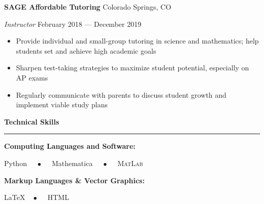 \documentclass{article}
\begin{document}
\hspace{1.5em} \textbf{SAGE Affordable Tutoring} \hfill Colorado Springs, CO

\hspace{1.5em} \textit{Instructor} \hfill February 2018 --- December 2019

\vspace{-0.5em}

\begin{itemize}[leftmargin=6.0em]
\setlength{\itemsep}{0em}
\item Provide individual and small-group tutoring in science and mathematics; help students set and achieve high academic goals
\item Sharpen test-taking strategies to maximize student potential, especially on AP exams
\item Regularly communicate with parents to discuss student growth and implement viable study plans
\end{itemize}

\vspace{1em}

\textbf{\Large{Technical Skills}} \\[-0.5em]
\rule{\textwidth}{1pt}

\hspace{1.5em} \textbf{Computing Languages and Software:}

\hspace{3.0em} Python $\quad\bullet\quad$ Mathematica $\quad\bullet\quad$ \textsc{MatLab}

\hspace{1.5em} \textbf{Markup Languages \& Vector Graphics:}

\hspace{3.0em} \LaTeX $\quad\bullet\quad$ HTML
\end{document}
